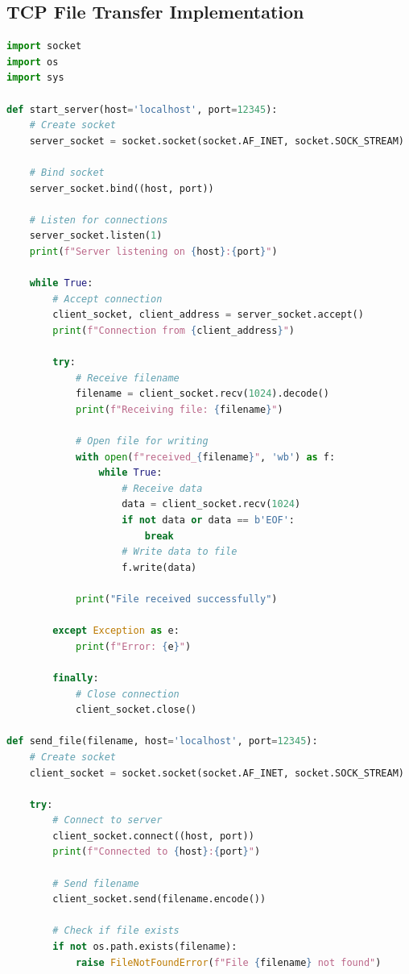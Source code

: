 \documentclass{article}
\begin{document}
\subsection{TCP File Transfer Implementation}
\begin{lstlisting}[language=Python]
import socket
import os
import sys

def start_server(host='localhost', port=12345):
    # Create socket
    server_socket = socket.socket(socket.AF_INET, socket.SOCK_STREAM)
    
    # Bind socket
    server_socket.bind((host, port))
    
    # Listen for connections
    server_socket.listen(1)
    print(f"Server listening on {host}:{port}")
    
    while True:
        # Accept connection
        client_socket, client_address = server_socket.accept()
        print(f"Connection from {client_address}")
        
        try:
            # Receive filename
            filename = client_socket.recv(1024).decode()
            print(f"Receiving file: {filename}")
            
            # Open file for writing
            with open(f"received_{filename}", 'wb') as f:
                while True:
                    # Receive data
                    data = client_socket.recv(1024)
                    if not data or data == b'EOF':
                        break
                    # Write data to file
                    f.write(data)
            
            print("File received successfully")
            
        except Exception as e:
            print(f"Error: {e}")
        
        finally:
            # Close connection
            client_socket.close()

def send_file(filename, host='localhost', port=12345):
    # Create socket
    client_socket = socket.socket(socket.AF_INET, socket.SOCK_STREAM)
    
    try:
        # Connect to server
        client_socket.connect((host, port))
        print(f"Connected to {host}:{port}")
        
        # Send filename
        client_socket.send(filename.encode())
        
        # Check if file exists
        if not os.path.exists(filename):
            raise FileNotFoundError(f"File {filename} not found")
        

\end{lstlisting}
\end{document}

